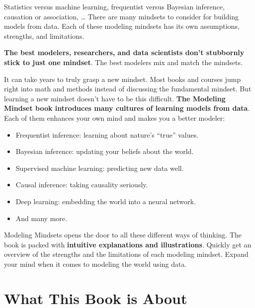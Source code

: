 \documentclass[
  10pt,
]{scrbook}
\providecommand{\tightlist}{%
  \setlength{\itemsep}{0pt}\setlength{\parskip}{0pt}}
\begin{document}
Statistics versus machine learning, frequentist versus Bayesian inference, causation or association, \ldots{}
There are many mindsets to consider for building models from data.
Each of these modeling mindsets has its own assumptions, strengths, and limitations.

\textbf{The best modelers, researchers, and data scientists don't stubbornly stick to just one mindset}.
The best modelers mix and match the mindsets.

It can take years to truly grasp a new mindset.
Most books and courses jump right into math and methods instead of discussing the fundamental mindset.
But learning a new mindset doesn't have to be this difficult.
\textbf{The Modeling Mindset book introduces many cultures of learning models from data}.
Each of them enhances your own mind and makes you a better modeler:

\begin{itemize}
\tightlist
\item
  Frequentist inference: learning about nature's ``true'' values.
\item
  Bayesian inference: updating your beliefs about the world.
\item
  Supervised machine learning: predicting new data well.
\item
  Causal inference: taking causality seriously.
\item
  Deep learning: embedding the world into a neural network.
\item
  And many more.
\end{itemize}

Modeling Mindsets opens the door to all these different ways of thinking.
The book is packed with \textbf{intuitive explanations and illustrations}.
Quickly get an overview of the strengths and the limitations of each modeling mindset.
Expand your mind when it comes to modeling the world using data.

\hypertarget{what-this-book-is-about}{%
\chapter{What This Book is About}\label{what-this-book-is-about}}
\end{document}

